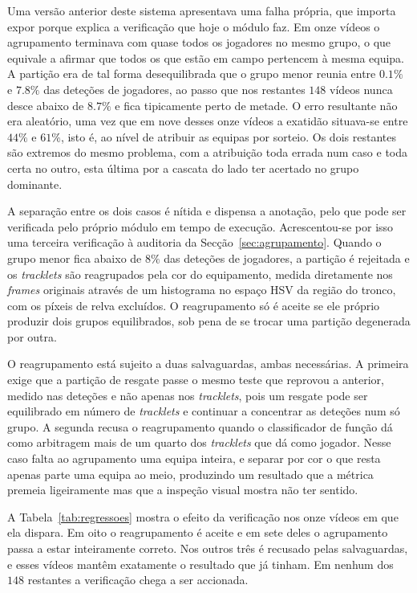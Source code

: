 Uma versão anterior deste sistema apresentava uma falha própria, que importa expor porque explica a
verificação que hoje o módulo faz. Em onze vídeos o agrupamento terminava com quase todos os
jogadores no mesmo grupo, o que equivale a afirmar que todos os que estão em campo pertencem à mesma
equipa. A partição era de tal forma desequilibrada que o grupo menor reunia entre $0.1\%$ e $7.8\%$
das deteções de jogadores, ao passo que nos restantes $148$ vídeos nunca desce abaixo de $8.7\%$ e
fica tipicamente perto de metade. O erro resultante não era aleatório, uma vez que em nove desses onze
vídeos a exatidão situava-se entre $44\%$ e $61\%$, isto é, ao nível de atribuir as equipas por
sorteio. Os dois restantes são extremos do mesmo problema, com a atribuição toda errada num caso e
toda certa no outro, esta última por a cascata do lado ter acertado no grupo dominante.

A separação entre os dois casos é nítida e dispensa a anotação, pelo que pode ser verificada pelo
próprio módulo em tempo de execução. Acrescentou-se por isso uma terceira verificação à auditoria da
Secção~\ref{sec:agrupamento}. Quando o grupo menor fica abaixo de $8\%$ das deteções de jogadores, a
partição é rejeitada e os \emph{tracklets} são reagrupados pela cor do equipamento, medida
diretamente nos \emph{frames} originais através de um histograma no espaço HSV da região do tronco,
com os píxeis de relva excluídos. O reagrupamento só é aceite se ele próprio produzir dois grupos
equilibrados, sob pena de se trocar uma partição degenerada por outra.

O reagrupamento está sujeito a duas salvaguardas, ambas necessárias. A primeira exige que a
partição de resgate passe o mesmo teste que reprovou a anterior, medido nas deteções e não apenas
nos \emph{tracklets}, pois um resgate pode ser equilibrado em número de \emph{tracklets} e continuar
a concentrar as deteções num só grupo. A segunda recusa o reagrupamento quando o classificador de
função dá como arbitragem mais de um quarto dos \emph{tracklets} que dá como jogador. Nesse caso
falta ao agrupamento uma equipa inteira, e separar por cor o que resta apenas parte uma equipa ao
meio, produzindo um resultado que a métrica premeia ligeiramente mas que a inspeção visual mostra
não ter sentido.

A Tabela~\ref{tab:regressoes} mostra o efeito da verificação nos onze vídeos em que ela dispara.
Em oito o reagrupamento é aceite e em sete deles o agrupamento passa a estar inteiramente correto.
Nos outros três é recusado pelas salvaguardas, e esses vídeos mantêm exatamente o resultado que já
tinham. Em nenhum dos $148$ restantes a verificação chega a ser accionada.

